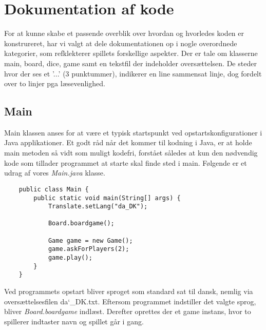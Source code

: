 \chapter{Dokumentation af kode}

\noindent For at kunne skabe et passende overblik over hvordan og hvorledes koden er konstrureret, har vi valgt at dele dokumentationen op i nogle overordnede kategorier, som refklekterer spillets forskellige aspekter. Der er tale om klasserne main, board, dice, game samt en tekstfil der indeholder oversættelsen.
De steder hvor der ses et '...' (3 punktummer), indikerer en line sammensat linje, dog fordelt over to linjer pga læsevenlighed.\\

\section{Main}
\noindent Main klassen anses for at være et typisk startspunkt ved opstartskonfigurationer i Java applikationer. 
Et godt råd når det kommer til kodning i Java, er at holde main metoden så vidt som muligt kodefri, forstået således at kun den nødvendig kode som tillader programmet at starte skal finde sted i main. 
Følgende er et udrag af vores \textit{Main.java} klasse.\\

\begin{lstlisting}
    public class Main {
        public static void main(String[] args) {
            Translate.setLang("da_DK");
    
            Board.boardgame();
    
            Game game = new Game();
            game.askForPlayers(2);
            game.play();
        }
    }
\end{lstlisting}
\vspace{2ex}

\noindent Ved programmets opstart bliver sproget som standard sat til dansk, nemlig via oversættelsesfilen da\char`_DK.txt. 
Eftersom programmet indstiller det valgte sprog, bliver \textit{Board.boardgame} indlæst. 
Derefter oprettes der et game instans, hvor to spillerer indtaster navn og spillet går i gang.\\

